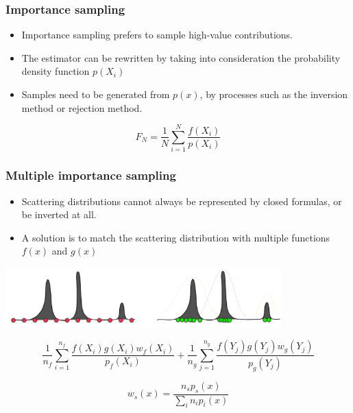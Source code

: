 \documentclass{beamer}
\begin{document}
  \begin{frame}
    \frametitle{Importance sampling}
    
    \begin{itemize}
    \item Importance sampling prefers to sample high-value contributions.
    
    \item The estimator can be rewritten by taking into consideration the probability density function $p(X_i)$
    
    \item Samples need to be generated from $p(x)$, by processes such as the inversion method or rejection method.
    
    \end{itemize}
    
     \begin{equation}
    F_N = \frac{1}{N} \sum^N_{i=1} \frac{f(X_i)}{p(X_i)}
    \end{equation}
    
  \end{frame}
  
    
  \begin{frame}
    \frametitle{Multiple importance sampling}
    
    \begin{itemize}
    \item Scattering distributions cannot always be represented by closed formulas, or be inverted at all.
    
    \item A solution is to match the scattering distribution with multiple functions $f(x)$ and $g(x)$
    \end{itemize}
    
        \includegraphics[width=0.8\textwidth,center]{importance_sampling_px.png}
    
    \begin{equation}
\frac{1}{n_f} \sum_{i=1}^{n_f} \frac{f(X_i)g(X_i) w_f(X_i)}{p_f(X_i)} + 
\frac{1}{n_g} \sum_{j=1}^{n_g} \frac{f(Y_j)g(Y_j) w_g(Y_j)}{p_g(Y_j)} 
\end{equation}

\begin{equation}
w_s(x) = \frac{n_sp_s(x)}{\sum_i n_i p_i(x)}
\end{equation}

    
  \end{frame}
\end{document}
